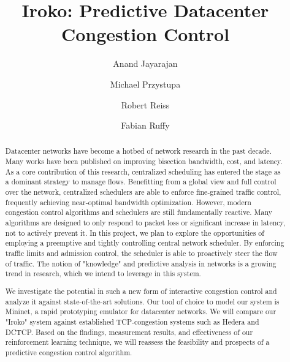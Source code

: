 \documentclass[sigconf]{acmart}
\begin{document}
\title{Iroko: Predictive Datacenter Congestion Control}

\author{Anand Jayarajan}

\author{Michael Przystupa}

\author{Robert Reiss}

\author{Fabian Ruffy}

\begin{abstract}
Datacenter networks have become a hotbed of network research in the past 
decade. Many works have been published on improving bisection bandwidth, cost, 
and latency. As a core contribution of this research, centralized scheduling 
has entered the stage as a dominant strategy to manage flows. Benefitting from 
a global view and full control over the network, centralized schedulers are 
able to enforce fine-grained traffic control, frequently achieving near-optimal 
bandwidth optimization. However, modern congestion control algorithms and 
schedulers are still fundamentally reactive. Many algorithms are designed to 
only respond to packet loss or significant increase in latency, not to actively 
prevent it.
In this project, we plan to explore the opportunities of employing a preemptive 
and tightly controlling central network scheduler. By enforcing traffic limits 
and admission control, the scheduler is able to proactively steer the flow of 
traffic. The notion of "knowledge" and predictive analysis in networks is a 
growing trend in research, which we intend to leverage in this system.

We investigate the potential in such a new form of interactive congestion 
control and analyze it against state-of-the-art solutions. Our tool of choice 
to model our system is Mininet, a rapid prototyping emulator for datacenter 
networks. We will compare our "Iroko" system against established TCP-congestion 
systems such as Hedera and DCTCP. Based on the findings, measurement results, 
and effectiveness of our reinforcement learning technique, we will reassess the 
feasibility and prospects of a predictive congestion control algorithm.
\end{abstract}





\maketitle



%









 
\end{document}
